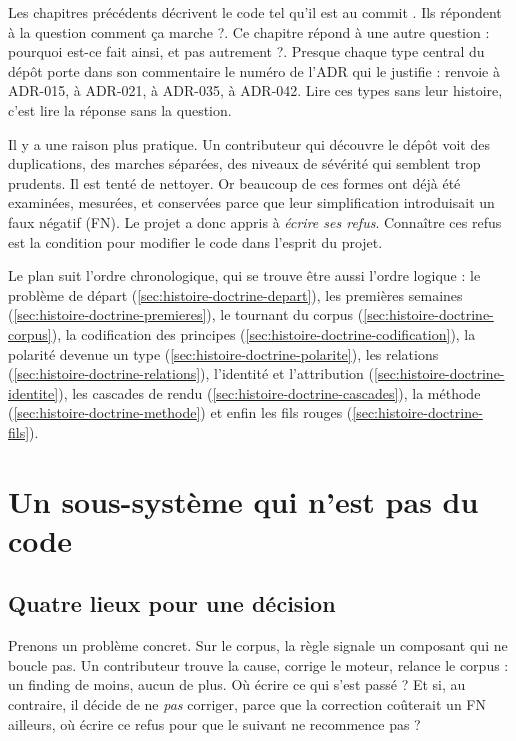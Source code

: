 Les chapitres précédents décrivent le code tel qu'il est au commit . Ils répondent à la question \og comment ça marche ?\fg{}. Ce chapitre répond à une autre question : \og pourquoi est-ce fait ainsi, et pas autrement ?\fg{}. Presque chaque type central du dépôt porte dans son commentaire le numéro de l'ADR qui le justifie :  renvoie à ADR-015,  à ADR-021,  à ADR-035,  à ADR-042. Lire ces types sans leur histoire, c'est lire la réponse sans la question.

Il y a une raison plus pratique. Un contributeur qui découvre le dépôt voit des duplications, des marches séparées, des niveaux de sévérité qui semblent trop prudents. Il est tenté de \og nettoyer\fg{}. Or beaucoup de ces formes ont déjà été examinées, mesurées, et conservées parce que leur simplification introduisait un faux négatif (FN). Le projet a donc appris à \emph{écrire ses refus}. Connaître ces refus est la condition pour modifier le code dans l'esprit du projet.

Le plan suit l'ordre chronologique, qui se trouve être aussi l'ordre logique : le problème de départ (\cref{sec:histoire-doctrine-depart}), les premières semaines (\cref{sec:histoire-doctrine-premieres}), le tournant du corpus (\cref{sec:histoire-doctrine-corpus}), la codification des principes (\cref{sec:histoire-doctrine-codification}), la polarité devenue un type (\cref{sec:histoire-doctrine-polarite}), les relations (\cref{sec:histoire-doctrine-relations}), l'identité et l'attribution (\cref{sec:histoire-doctrine-identite}), les cascades de rendu (\cref{sec:histoire-doctrine-cascades}), la méthode (\cref{sec:histoire-doctrine-methode}) et enfin les fils rouges (\cref{sec:histoire-doctrine-fils}).

\section{Un sous-système qui n'est pas du code}
\label{sec:histoire-doctrine-appareil}

\subsection{Quatre lieux pour une décision}

Prenons un problème concret. Sur le corpus, la règle  signale un composant qui ne boucle pas. Un contributeur trouve la cause, corrige le moteur, relance le corpus : un finding de moins, aucun de plus. Où écrire ce qui s'est passé ? Et si, au contraire, il décide de ne \emph{pas} corriger, parce que la correction coûterait un FN ailleurs, où écrire ce refus pour que le suivant ne recommence pas ?

